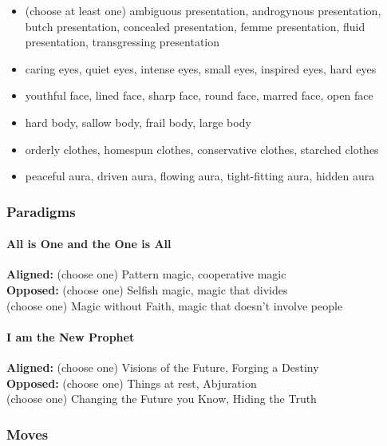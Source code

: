 \documentclass[
]{article}
\providecommand{\tightlist}{%
  \setlength{\itemsep}{0pt}\setlength{\parskip}{0pt}}
\begin{document}
\begin{itemize}
\tightlist
\item
  (choose at least one) ambiguous presentation, androgynous
  presentation, butch presentation, concealed presentation, femme
  presentation, fluid presentation, transgressing presentation
\item
  caring eyes, quiet eyes, intense eyes, small eyes, inspired eyes, hard
  eyes
\item
  youthful face, lined face, sharp face, round face, marred face, open
  face
\item
  hard body, sallow body, frail body, large body
\item
  orderly clothes, homespun clothes, conservative clothes, starched
  clothes
\item
  peaceful aura, driven aura, flowing aura, tight-fitting aura, hidden
  aura
\end{itemize}

\hypertarget{paradigms-4}{%
\subsubsection{Paradigms}\label{paradigms-4}}

\hypertarget{all-is-one-and-the-one-is-all}{%
\paragraph{All is One and the One is
All}\label{all-is-one-and-the-one-is-all}}

\textbf{Aligned:} (choose one) Pattern magic, cooperative magic\\
\textbf{Opposed:} (choose one) Selfish magic, magic that divides\\
(choose one) Magic without Faith, magic that doesn't involve people

\hypertarget{i-am-the-new-prophet}{%
\paragraph{I am the New Prophet}\label{i-am-the-new-prophet}}

\textbf{Aligned:} (choose one) Visions of the Future, Forging a
Destiny\\
\textbf{Opposed:} (choose one) Things at rest, Abjuration\\
(choose one) Changing the Future you Know, Hiding the Truth

\hypertarget{moves-4}{%
\subsubsection{Moves}\label{moves-4}}
\end{document}
